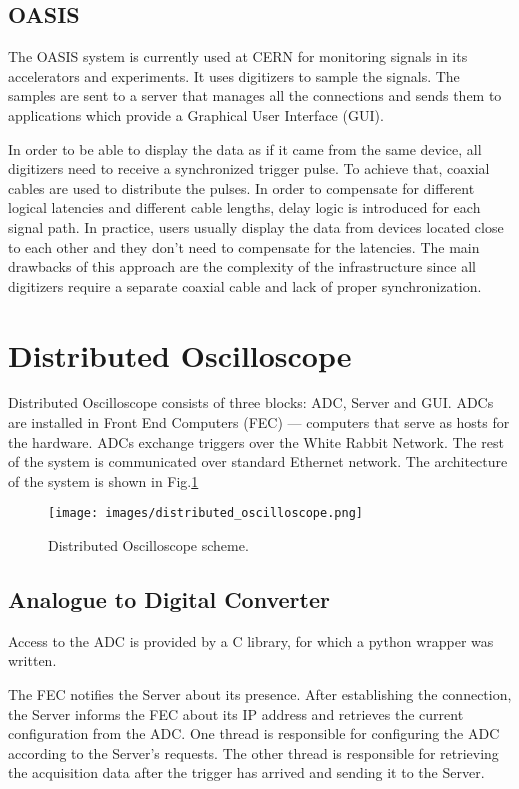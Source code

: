 \documentclass[conference]{IEEEtran}
\begin{document}
\subsection{OASIS}
The OASIS system is currently used at CERN for monitoring signals in its accelerators and experiments. It uses digitizers to sample the signals. The samples are sent to a server that manages all the connections and sends them to applications which provide a Graphical User Interface (GUI).

In order to be able to display the data as if it came from the same device, all digitizers need to receive a synchronized trigger pulse. To achieve that, coaxial cables are used to distribute the pulses. In order to compensate for different logical latencies and different cable lengths, delay logic is introduced for each signal path\cite{b1}. In practice, users usually display the data from devices located close to each other and they don't need to compensate for the latencies.  The main drawbacks of this approach are the complexity of the infrastructure since all digitizers require a separate coaxial cable and lack of proper synchronization. 

\section{Distributed Oscilloscope}

Distributed Oscilloscope consists of three blocks: ADC, Server and GUI. ADCs are installed in Front End Computers (FEC) --- computers that serve as hosts for the hardware. ADCs exchange triggers over the White Rabbit Network. The rest of the system is communicated over standard Ethernet network. The architecture of the system is shown in Fig.\ref{dist_osc} 

\begin{figure}
\centerline{\texttt{[image: images/distributed\_oscilloscope.png]}}
\caption{Distributed Oscilloscope scheme.}
\label{dist_osc}
\end{figure}


\subsection{Analogue to Digital Converter}
Access to the ADC is provided by a C library, for which a python wrapper was written.

The FEC notifies the Server about its presence. After establishing the connection, the Server informs the FEC about its IP address and retrieves the current configuration from the ADC. One thread is responsible for configuring the ADC according to the Server's requests. The other thread is responsible for retrieving the acquisition data after the trigger has arrived and sending it to the Server. 
\end{document}
